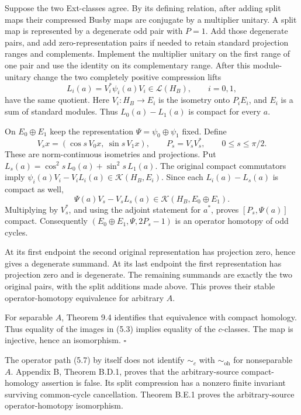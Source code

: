 \documentclass[
  11pt,
]{article}
\begin{document}
Suppose the two Ext-classes agree. By its defining relation, after
adding split maps their compressed Busby maps are conjugate by a
multiplier unitary. A split map is represented by a degenerate odd pair
with \(P=1\). Add those degenerate pairs, and add zero-representation
pairs if needed to retain standard projection ranges and complements.
Implement the multiplier unitary on the first range of one pair and use
the identity on its complementary range. After this module-unitary
change the two completely positive compression lifts \[
L_i(a)=V_i^*\psi_i(a)V_i\in\mathcal L(H_B),\qquad i=0,1,
\tag{5.6}
\] have the same quotient. Here \(V_i:H_B\to E_i\) is the isometry onto
\(P_iE_i\), and \(E_i\) is a sum of standard modules. Thus
\(L_0(a)-L_1(a)\) is compact for every \(a\).

On \(E_0\oplus E_1\) keep the representation \(\Psi=\psi_0\oplus\psi_1\)
fixed. Define \[
V_sx=(\cos s\,V_0x,\ \sin s\,V_1x),\qquad
P_s=V_sV_s^*,\qquad 0\leq s\leq\pi/2.
\tag{5.7}
\] These are norm-continuous isometries and projections. Put
\(L_s(a)=\cos^2s\,L_0(a)+\sin^2s\,L_1(a)\). The original compact
commutators imply \(\psi_i(a)V_i-V_iL_i(a)\in\mathcal K(H_B,E_i)\).
Since each \(L_i(a)-L_s(a)\) is compact as well, \[
\Psi(a)V_s-V_sL_s(a)\in\mathcal K(H_B,E_0\oplus E_1).
\tag{5.8}
\] Multiplying by \(V_s^*\), and using the adjoint statement for
\(a^*\), proves \([P_s,\Psi(a)]\) compact. Consequently
\((E_0\oplus E_1,\Psi,2P_s-1)\) is an operator homotopy of odd cycles.

At its first endpoint the second original representation has projection
zero, hence gives a degenerate summand. At its last endpoint the first
representation has projection zero and is degenerate. The remaining
summands are exactly the two original pairs, with the split additions
made above. This proves their stable operator-homotopy equivalence for
arbitrary \(A\).

For separable \(A\), Theorem 9.4 identifies that equivalence with
compact homology. Thus equality of the images in (5.3) implies equality
of the \(c\)-classes. The map is injective, hence an isomorphism.
\(\square\)

The operator path (5.7) by itself does not identify \(\sim_c\) with
\(\sim_{\mathrm{oh}}\) for nonseparable \(A\). Appendix B, Theorem
B.D.1, proves that the arbitrary-source compact-homology assertion is
false. Its split compression has a nonzero finite invariant surviving
common-cycle cancellation. Theorem B.E.1 proves the arbitrary-source
operator-homotopy isomorphism.
\end{document}
